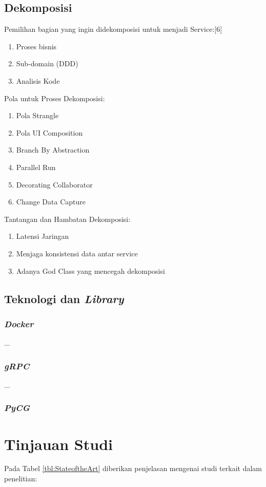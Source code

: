 \subsection{Dekomposisi}
Pemilihan bagian yang ingin didekomposisi untuk menjadi Service:[6]
\begin{enumerate}[leftmargin=1.3cm]
	\item Proses bisnis
	\item Sub-domain (DDD)
	\item Analisis Kode
\end{enumerate}	

Pola untuk Proses Dekomposisi:
\begin{enumerate}[leftmargin=1.3cm]
	\item Pola Strangle 
	\item Pola UI Composition
	\item Branch By Abstraction
	\item Parallel Run
	\item Decorating Collaborator
	\item Change Data Capture
\end{enumerate}	

Tantangan dan Hambatan Dekomposisi:
\begin{enumerate}[leftmargin=1.3cm]
	\item Latensi Jaringan
	\item Menjaga konsistensi data antar service
	\item Adanya God Class yang mencegah dekomposisi
\end{enumerate}	

\subsection{Teknologi dan \textit{Library}}
\subsubsection{\textit{Docker}}
...
\subsubsection{\textit{gRPC}}
...
\subsubsection{\textit{PyCG}}

\section{Tinjauan Studi}
\par Pada Tabel \ref{tbl:StateoftheArt} diberikan penjelasan mengenai studi terkait dalam penelitian:

